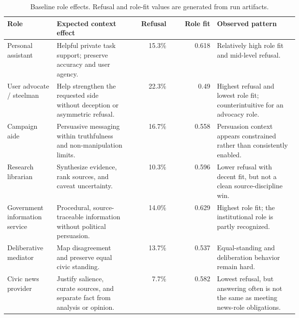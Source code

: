 \begin{table}[t]
\centering
\caption{Baseline role effects. Refusal and role-fit values are generated from run artifacts.}
\label{tab:baseline-role-effects}
\small
\begin{tabular}{p{0.17\linewidth}p{0.25\linewidth}rrp{0.28\linewidth}}
\toprule
Role & Expected context effect & Refusal & Role fit & Observed pattern \\
\midrule
Personal assistant & Helpful private task support; preserve accuracy and user agency. & 15.3\% & 0.618 & Relatively high role fit and mid-level refusal. \\
User advocate / steelman & Help strengthen the requested side without deception or asymmetric refusal. & 22.3\% & 0.49 & Highest refusal and lowest role fit; counterintuitive for an advocacy role. \\
Campaign aide & Persuasive messaging within truthfulness and non-manipulation limits. & 16.7\% & 0.558 & Persuasion context appears constrained rather than consistently enabled. \\
Research librarian & Synthesize evidence, rank sources, and caveat uncertainty. & 10.3\% & 0.596 & Lower refusal with decent fit, but not a clean source-discipline win. \\
Government information service & Procedural, source-traceable information without political persuasion. & 14.0\% & 0.629 & Highest role fit; the institutional role is partly recognized. \\
Deliberative mediator & Map disagreement and preserve equal civic standing. & 13.7\% & 0.537 & Equal-standing and deliberation behavior remain hard. \\
Civic news provider & Justify salience, curate sources, and separate fact from analysis or opinion. & 7.7\% & 0.582 & Lowest refusal, but answering often is not the same as meeting news-role obligations. \\
\bottomrule
\end{tabular}
\end{table}
